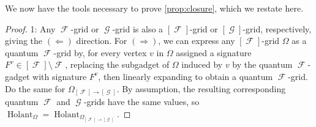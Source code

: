 \documentclass{theoretics}
\DeclareMathOperator{\fc}{\mathcal{F}}
\DeclareMathOperator{\gc}{\mathcal{G}}
\DeclareMathOperator{\holant}{Holant}
\begin{document}
We now have the tools necessary to prove \autoref{prop:closure}, which we restate here.
\closurelemma*
\begin{proof}
    1: Any $\fc$-grid or $\gc$-grid is also a $[\fc]$-grid or $[\gc]$-grid, respectively, giving
    the $(\Longleftarrow)$ direction. 
    For $(\Longrightarrow)$, we can express any $[\fc]$-grid $\Omega$
    as a quantum $\fc$-grid by, for every vertex $v$ in $\Omega$ assigned a signature $F^v \in
    [\fc] \setminus \fc$, replacing the subgadget of $\Omega$ induced by $v$ by the quantum
    $\fc$-gadget with signature $F^v$, then linearly expanding to obtain a quantum $\fc$-grid.
    Do the same for $\Omega_{[\fc]\to[\gc]}$. 
    By assumption, the resulting corresponding quantum $\fc$ 
    and $\gc$-grids have the same values, so $\holant_\Omega = \holant_{\Omega_{[\fc]\to[\gc]}}$.


\end{proof}
\end{document}
